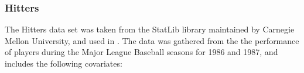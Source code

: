 \documentclass{amsart}[12pt]
\begin{document}

\subsubsection{Hitters}

The Hitters data set was taken from the StatLib library maintained by Carnegie Mellon University, and used in
\cite{James:2014:ISL:2517747}. The data was gathered from the the performance of players during the Major
League Baseball seasons for 1986 and 1987, and includes the following covariates:
\end{document}
